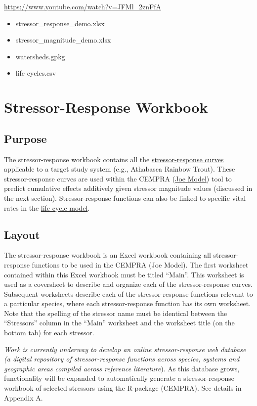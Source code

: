 \documentclass[
  letterpaper,
  DIV=11,
  numbers=noendperiod]{scrreprt}
\providecommand{\tightlist}{%
  \setlength{\itemsep}{0pt}\setlength{\parskip}{0pt}}
\begin{document}
\url{https://www.youtube.com/watch?v=JFMl_2znFfA}

\begin{itemize}
\tightlist
\item
  stressor\_response\_demo.xlsx
\item
  stressor\_magnitude\_demo.xlsx
\item
  watersheds.gpkg
\item
  life cycles.csv
\end{itemize}

\section{Stressor-Response Workbook}\label{stressor-response-workbook}

\subsection{Purpose}\label{purpose-1}

The stressor-response workbook contains all the
\hyperref[stressor-response-functions]{stressor-response curves}
applicable to a target study system (e.g., Athabasca Rainbow Trout).
These stressor-response curves are used within the CEMPRA
(\hyperref[modelling-pathways-and-assessment-endpoints]{Joe Model}) tool
to predict cumulative effects additively given stressor magnitude values
(discussed in the next section). Stressor-response functions can also be
linked to specific vital rates in the
\href{07_life_cycle_model.qmd}{life cycle model}.

\subsection{Layout}\label{layout}

The stressor-response workbook is an Excel workbook containing all
stressor-response functions to be used in the CEMPRA (Joe Model). The
first worksheet contained within this Excel workbook must be titled
``Main''. This worksheet is used as a coversheet to describe and
organize each of the stressor-response curves. Subsequent worksheets
describe each of the stressor-response functions relevant to a
particular species, where each stressor-response function has its own
worksheet. Note that the spelling of the stressor name must be identical
between the ``Stressors'' column in the ``Main'' worksheet and the
worksheet title (on the bottom tab) for each stressor.

\emph{Work is currently underway to develop an online stressor-response
web database (a digital repository of stressor-response functions across
species, systems and geographic areas compiled across reference
literature}). As this database grows, functionality will be expanded to
automatically generate a stressor-response workbook of selected
stressors using the R-package (CEMPRA). See details in Appendix A.
\end{document}
